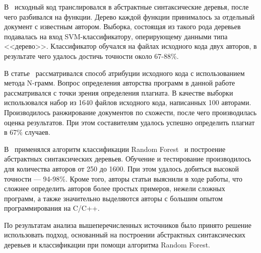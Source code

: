 В~\cite{pellin} исходный код транслировался в абстрактные синтаксические деревья, после чего разбивался на функции. Дерево каждой функции принималось за отдельный документ с известным автором. Выборка, состоящая из такого рода деревьев подавалась на вход SVM-классификатору, оперирующему данными типа <<дерево>>. Классификатор обучался на файлах исходного кода двух авторов, в результате чего удалось достичь точности около 67-88\%.

В статье~\cite{burrows} рассматривался способ атрибуции исходного кода с использованием метода N-грамм. Вопрос определения авторства программ в данной работе рассматривался с точки зрения определения плагиата. В качестве выборки использовался набор из 1640 файлов исходного кода, написанных 100 авторами. Производилось ранжирование документов по схожести, после чего производилась оценка результатов. При этом составителям удалось успешно определить плагиат в 67\% случаев.

В~\cite{caliskan} применялся алгоритм классификации Random Forest~\cite{random_forest} и построение абстрактных синтаксических деревьев. Обучение и тестирование производилось для количества авторов от 250 до 1600. При этом удалось добиться высокой точности --- 94-98\%. Кроме того, авторы статьи выяснили в ходе работы, что сложнее определить авторов более простых примеров, нежели сложных программ, а также значительно выделяются авторы с большим опытом программирования на C/C++.

По результатам анализа вышеперечисленных источников было принято решение использовать подход, основанный на построении абстрактных синтаксических деревьев и классификации при помощи алгоритма Random Forest.
